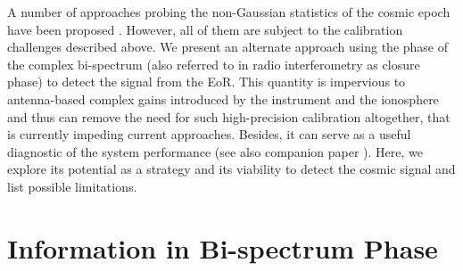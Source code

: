 \documentclass[
reprint,
superscriptaddress,
amsmath,
amssymb,
aps,
prd
]{revtex4-1}
\begin{document}
A number of approaches probing the non-Gaussian statistics of the cosmic epoch have been proposed \cite{lid07,bar08,harker09,wat14,kit16,ali06,son15,shi16,maj17}. However, all of them are subject to the calibration challenges described above. We present an alternate approach using the phase of the complex bi-spectrum (also referred to in radio interferometry as closure phase) to detect the signal from the EoR. This quantity is impervious to antenna-based complex gains introduced by the instrument and the ionosphere and thus can remove the need for such high-precision calibration altogether, that is currently impeding current approaches. Besides, it can serve as a useful diagnostic of the system performance (see also companion paper \cite{car18}). Here, we explore its potential as a strategy and its viability to detect the cosmic signal and list possible limitations.

\section{Information in Bi-spectrum Phase}\label{sec:CPinfo}
\end{document}

